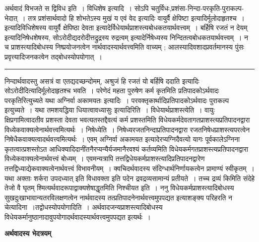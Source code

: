 \documentclass[11pt, openany]{book}
\makeatletter
\def\blfootnote{\gdef\@thefnmark{}\@footnotetext}
\makeatother
\begin{document}
 अर्थवादं विभजते {\br स द्विविध इति~। विधिशेष इत्यादि~।} सोऽपि चतुर्विधः,\textendash प्रशंसा-निन्दा-परकृति-पुराकल्प-भेदात्~। तत्र प्रशंसार्थवादो हि  {\qt शोभतेऽस्य मुखं य एवं वेद} इत्यादिः {\qt वायुर्वै क्षेपिष्टा} इत्यादिर्मूलोदाहृतश्च~।
\blfootnote{पाठा०\textemdash\ $^{१}$निषिध्यमानयो~।}
\newpage
\fancyhead[RE]{[ अर्थवादविभागः ]}
{\bl{} इत्यादिविधिशेषस्य {\qtl वायुर्वै क्षेपिष्ठा देवता} इत्यादेर्विधेयार्थप्राशस्त्यबोधकतयार्थवत्त्वम्~। {\qtl बर्हिषि 
रजतं न देयम्} इत्यादिनिषेधशेषस्य, {\qtl सोऽरोदीद्यदरोदीत्तद्रुद्रस्य  रुद्रत्वम्} इत्यादेर्निषेध्यस्य निन्दितत्वबोधकतयार्थवत्त्वम्~। न च  प्राशस्त्यादिबोधस्य निष्प्रयोजनत्वेन नार्थवादस्यार्थवत्त्वमिति  वाच्यम् ; आलस्यादिवशादप्रवर्तमानस्य पुंसः प्रवृत्त्यादिजनकत्वेन तद्बोधस्योपयोगात्~।~}\\
\hrule
\vspace{3mm}
\noindent
निन्दार्थवादस्तु {\qt असत्रं वा एतद्यदच्छन्दोमम्, अश्रुजं हि रजतं यो बर्हिषि ददाति} इत्यादिः सोऽरोदीदित्यादिर्मूलोदाहृतश्च भवति~। परेणेदं महता पुरुषेण कर्म कृतमिति प्रतिपादकोऽर्थवादः परकृतिरित्युच्यते यथा {\qt अग्निर्वा अकामयतः} इत्यादिः~। परवक्तृकार्थादिप्रतिपादकोऽर्थवादः पुराकल्प इत्युच्यते~। यथा  {\qt तमशयद्धिया धियात्वावध्यासुः} इत्यादिरिति~। {\br विधेयार्थप्राशस्त्येति~।} वायुः क्षिप्रगामित्वादतीव प्रशस्ता देवता भवत्यतस्तद्दैवत्यं कर्म प्रशस्तमिति विधेयकर्मदेवतागतप्राशस्त्यप्रतिपादनद्वारा विध्येकवाक्यत्वेनार्थवत्त्वमित्यर्थः~। {\br निषेध्येति~।} निषेध्यरजतनिन्दाप्रतिपादनद्वारा रजतनिषेधप्राशस्त्यपरत्वेन निषेधैकवाक्यत्वादर्थवत्त्वमित्यर्थः~। एवम् {\qt अग्निर्वा अकामयत} इत्यादेरप्यग्निदैवत्यो यागः पूर्वकालेऽग्निना कृतत्वात्प्रशस्तोऽत आधिक्यादिदानींतनैरप्यन्यैर्यजमानैरवश्यं कर्तव्यमिति विधेयकर्मगतप्राशस्त्यप्रतिपादनद्वारा विध्येकवाक्यत्वेनार्थवत्त्वं बोध्यम्~। एवमन्यत्रापि तत्तद्विधेयकर्मप्राशस्त्यादिप्रतिपादनद्वारेण तत्तद्विध्याद्येकवाक्यत्वेनार्थवत्त्वं विभावनीयम्~। क्वचिदर्थवादस्य संदिग्धार्थनिर्णायकत्वेन प्रामाण्यं स्वीकृतम्~। यथा {\qt अक्ताः शर्करा उपदध्यात्}  इति विधावक्ता इति पदेन द्रवद्रव्यसामान्यं प्रतीयते~। तच्च द्रव्यं किमिति संदेहे {\qt तेजो वै घृतम्} श्मित्यर्थवादरूपाद्वाक्यशेषाद्धृतमिति निश्चीयत इति~। {\br ननु} विधेयकर्मप्राशस्त्यादिबोधस्य सुखदुःखाभावान्यतरविलक्षणत्वेन नार्थवादस्य तत्प्रतिपादनेनार्थवत्त्वमुपपद्यत इत्याशङ्क्य परिहरति {\br न चेत्यादिना~।तद्वोधस्योपयोगादिति~।} अर्थवादजन्यप्राशस्त्यादिबोधस्य विधेयकर्मानुष्ठानादावुपयोगादर्थवादस्यार्थवत्त्वमुपपद्यत इत्यर्थः~।
\newpage
\fancyhead[LO]{[ ग्रन्थोपसंहारः ]}
\begin{center}
 \textbf{अर्थवादस्य भेदत्रयम् }   
\end{center}
 
\end{document}

